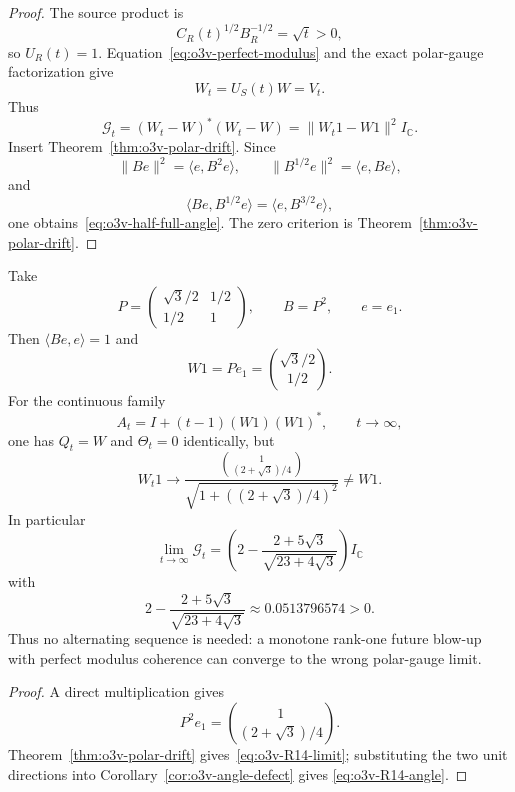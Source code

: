 \begin{proof}
The source product is
\[
 C_R(t)^{1/2}B_R^{-1/2}=\sqrt t>0,
\]
so \(U_R(t)=1\).  Equation~\eqref{eq:o3v-perfect-modulus} and the exact polar-gauge
factorization give
\[
 W_t=U_S(t)W=V_t.
\]
Thus
\[
 \mathscr G_t
 =(W_t-W)^*(W_t-W)
 =\|W_t1-W1\|^2I_{\mathbb C}.
\]
Insert Theorem~\ref{thm:o3v-polar-drift}.  Since
\[
 \|Be\|^2=\langle e,B^2e\rangle,
 \qquad
 \|B^{1/2}e\|^2=\langle e,Be\rangle,
\]
and
\[
 \langle Be,B^{1/2}e\rangle
 =\langle e,B^{3/2}e\rangle,
\]
one obtains~\eqref{eq:o3v-half-full-angle}.  The zero criterion is
Theorem~\ref{thm:o3v-polar-drift}.
\end{proof}

\begin{corollary}
\label{cor:o3v-R14-strengthening}
Take
\[
 P=
 \begin{pmatrix}
 \sqrt3/2&1/2\\
 1/2&1
 \end{pmatrix},
 \qquad
 B=P^2,
 \qquad
 e=e_1.
\]
Then \(\langle Be,e\rangle=1\) and
\[
 W1=Pe_1
 =\binom{\sqrt3/2}{1/2}.
\]
For the continuous family
\[
 A_t=I+(t-1)(W1)(W1)^*,
 \qquad t\to\infty,
\]
one has \(Q_t=W\) and \(\Theta_t=0\) identically, but
\[
 \boxed{
 W_t1\longrightarrow
 \frac{
 \binom{1}{(2+\sqrt3)/4}
 }{
 \sqrt{1+((2+\sqrt3)/4)^2}
 }
 \ne W1.
 }
\tag{O3V.10}\label{eq:o3v-R14-limit}
\]
In particular
\[
 \boxed{
 \lim_{t\to\infty}\mathscr G_t
 =\left(
 2-\frac{2+5\sqrt3}{\sqrt{23+4\sqrt3}}
 \right)I_{\mathbb C}
 }
\tag{O3V.11}\label{eq:o3v-R14-angle}
\]
with
\[
 2-\frac{2+5\sqrt3}{\sqrt{23+4\sqrt3}}
 \approx0.0513796574>0.
\]
Thus no alternating sequence is needed: a monotone rank-one future blow-up with perfect
modulus coherence can converge to the wrong polar-gauge limit.
\end{corollary}

\begin{proof}
A direct multiplication gives
\[
 P^2e_1
 =\binom{1}{(2+\sqrt3)/4}.
\]
Theorem~\ref{thm:o3v-polar-drift} gives~\eqref{eq:o3v-R14-limit}; substituting the two
unit directions into Corollary~\ref{cor:o3v-angle-defect} gives
\eqref{eq:o3v-R14-angle}.
\end{proof}

